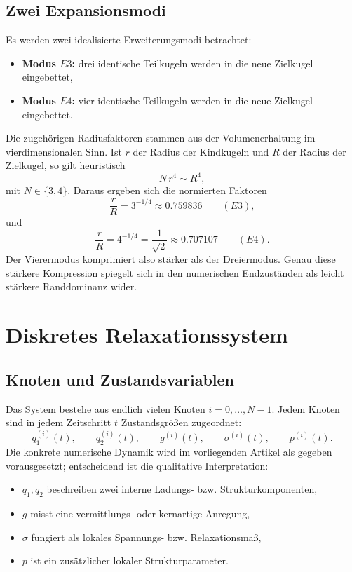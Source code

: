\documentclass[11pt,a4paper]{article}
\theoremstyle{definition}
\theoremstyle{remark}
\begin{document}
	\subsection{Zwei Expansionsmodi}
	Es werden zwei idealisierte Erweiterungsmodi betrachtet:
	\begin{itemize}[leftmargin=2em]
		\item \textbf{Modus $E3$:} drei identische Teilkugeln werden in die neue Zielkugel eingebettet,
		\item \textbf{Modus $E4$:} vier identische Teilkugeln werden in die neue Zielkugel eingebettet.
	\end{itemize}
	Die zugehörigen Radiusfaktoren stammen aus der Volumenerhaltung im vierdimensionalen Sinn. Ist $r$ der Radius der Kindkugeln und $R$ der Radius der Zielkugel, so gilt heuristisch
	\[
	N\,r^4 \sim R^4,
	\]
	mit $N\in\{3,4\}$. Daraus ergeben sich die normierten Faktoren
	\[
	\frac{r}{R}=3^{-1/4}\approx 0.759836 \qquad (E3),
	\]
	und
	\[
	\frac{r}{R}=4^{-1/4}=\frac{1}{\sqrt 2}\approx 0.707107 \qquad (E4).
	\]
	Der Vierermodus komprimiert also stärker als der Dreiermodus. Genau diese stärkere Kompression spiegelt sich in den numerischen Endzuständen als leicht stärkere Randdominanz wider.
	
	\section{Diskretes Relaxationssystem}
	\subsection{Knoten und Zustandsvariablen}
	Das System bestehe aus endlich vielen Knoten $i=0,\dots,N-1$. Jedem Knoten sind in jedem Zeitschritt $t$ Zustandsgrößen zugeordnet:
	\[
	q_1^{(i)}(t),\qquad q_2^{(i)}(t),\qquad g^{(i)}(t),\qquad \sigma^{(i)}(t),\qquad p^{(i)}(t).
	\]
	Die konkrete numerische Dynamik wird im vorliegenden Artikel als gegeben vorausgesetzt; entscheidend ist die qualitative Interpretation:
	\begin{itemize}[leftmargin=2em]
		\item $q_1,q_2$ beschreiben zwei interne Ladungs- bzw. Strukturkomponenten,
		\item $g$ misst eine vermittlungs- oder kernartige Anregung,
		\item $\sigma$ fungiert als lokales Spannungs- bzw. Relaxationsmaß,
		\item $p$ ist ein zusätzlicher lokaler Strukturparameter.
	\end{itemize}
	
\end{document}

